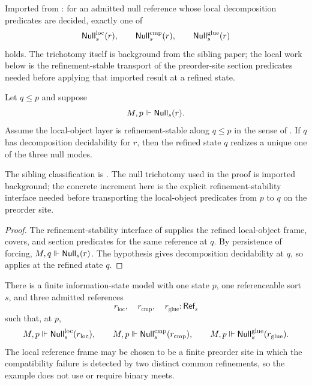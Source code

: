\begin{proposition}\label{prop:null-trichotomy}
Imported from \cite[Proposition~4.15]{HomologicalVisibilityGluingObstructions2026}:
for an admitted null reference whose local decomposition predicates are
decided, exactly one of
\[
\mathsf{Null}^{\mathrm{loc}}_s(r),\qquad
\mathsf{Null}^{\mathrm{cmp}}_s(r),\qquad
\mathsf{Null}^{\mathrm{glue}}_s(r)
\]
holds. The trichotomy itself is background from the sibling paper; the local
work below is the refinement-stable transport of the preorder-site section
predicates needed before applying that imported result at a refined state.
\end{proposition}

\begin{theorem}\label{thm:null-classification-under-refinement}
Let $q\le p$ and suppose
\[
M,p\Vdash \mathsf{Null}_s(r).
\]
Assume the local-object layer is refinement-stable along $q\le p$ in the sense
of . If $q$ has decomposition
decidability for $r$, then the refined state $q$ realizes a unique one of the
three null modes.
\end{theorem}

\begin{remark}
The sibling classification is
\cite[Theorem~4.16]{HomologicalVisibilityGluingObstructions2026}. The null
trichotomy used in the proof is imported background; the concrete increment
here is the explicit refinement-stability interface needed before transporting
the local-object predicates from $p$ to $q$ on the preorder site.
\end{remark}

\begin{proof}
The refinement-stability interface of
 supplies the refined
local-object frame, covers, and section predicates for the same reference at
$q$. By persistence of forcing, $M,q\Vdash \mathsf{Null}_s(r)$. The hypothesis gives
decomposition decidability at $q$, so  applies at the
refined state $q$.
\end{proof}

\begin{proposition}\label{prop:finite-three-mode-model}
There is a finite information-state model with one state $p$, one
referenceable sort $s$, and three admitted references
\[
r_{\mathrm{loc}},\quad r_{\mathrm{cmp}},\quad r_{\mathrm{glue}}:\mathsf{Ref}_s
\]
such that, at $p$,
\[
M,p\Vdash \mathsf{Null}^{\mathrm{loc}}_s(r_{\mathrm{loc}}),
\qquad
M,p\Vdash \mathsf{Null}^{\mathrm{cmp}}_s(r_{\mathrm{cmp}}),
\qquad
M,p\Vdash \mathsf{Null}^{\mathrm{glue}}_s(r_{\mathrm{glue}}).
\]
The local reference frame may be chosen to be a finite preorder site in which
the compatibility failure is detected by two distinct common refinements, so
the example does not use or require binary meets.
\end{proposition}

